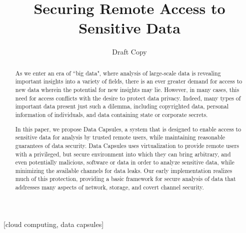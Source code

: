 \documentclass{acm_proc_article-sp}
\begin{document}
\title{Securing Remote Access to Sensitive Data}

\author{
Draft Copy
}

%

\maketitle
\begin{abstract}

As we enter an era of ``big data", where analysis of large-scale data is
revealing important insights into a variety of fields, there is an ever greater
demand for access to new data wherein the potential for new insights may lie.
However, in many cases, this need for access conflicts with the desire to
protect data privacy.  Indeed, many types of important data present just such a
dilemma, including copyrighted data, personal information of individuals, and
data containing state or corporate secrets.

In this paper, we propose Data Capsules, a system that is designed to enable
access to sensitive data for analysis by trusted remote users, while
maintaining reasonable guarantees of data security.  Data Capsules uses
virtualization to provide remote users with a privileged, but secure
environment into which they can bring arbitrary, and even potentially
malicious, software or data in order to analyze sensitive data, while
minimizing the available channels for data leaks.  Our early implementation
realizes much of this protection, providing a basic framework for secure analysis of data that addresses many aspects of network, storage, and covert channel security.

\end{abstract}

[cloud computing, data capsules]
\end{document}
